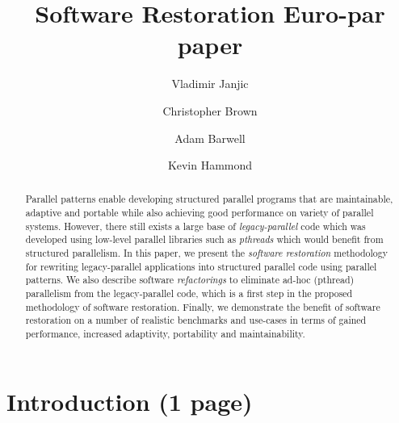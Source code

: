 \documentclass{llncs}
\begin{document}
\title{Software Restoration Euro-par paper}


\author{Vladimir Janjic \and Christopher Brown \and Adam Barwell \and Kevin Hammond}


\maketitle


\begin{abstract}
    Parallel patterns enable developing structured parallel programs that are maintainable, adaptive and portable while also achieving good performance on variety of parallel systems. However, there still exists a large base of \emph{legacy-parallel} code which was developed using low-level parallel libraries such as \emph{pthreads} which would benefit from structured parallelism. In this paper, we present the \emph{software restoration} methodology for rewriting legacy-parallel applications into structured parallel code using parallel patterns. We also describe software \emph{refactorings} to eliminate ad-hoc (pthread) parallelism from the legacy-parallel code, which is a first step in the proposed methodology of software restoration. Finally, we demonstrate the benefit of software restoration on a number of realistic benchmarks and use-cases in terms of gained performance, increased adaptivity, portability and maintainability. 
\end{abstract}


\section{Introduction (1 page)}


\end{document}
